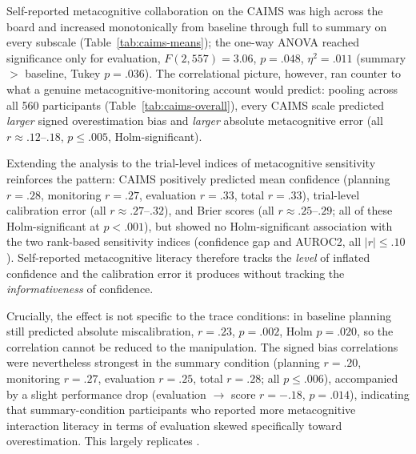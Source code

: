 \documentclass[acmlarge,review=true, anonymous=true]{acmart}
\begin{document}
Self-reported metacognitive collaboration on the CAIMS was high across the board and increased monotonically from baseline through full to summary on every
subscale (Table~\ref{tab:caims-means}); the one-way ANOVA reached
significance only for evaluation, $F(2, 557) = 3.06$, $p = .048$,
$\eta^2 = .011$ (summary $>$ baseline, Tukey $p = .036$). The correlational picture, however, ran counter to what a genuine
metacognitive-monitoring account would predict: pooling across all 560 participants (Table~\ref{tab:caims-overall}), every CAIMS scale
predicted \emph{larger} signed overestimation bias and \emph{larger} absolute metacognitive error (all $r \approx .12$--$.18$,
$p \leq .005$, Holm-significant). 

Extending the analysis to the trial-level indices of metacognitive sensitivity reinforces the pattern: CAIMS
positively predicted mean confidence (planning $r = .28$, monitoring $r = .27$, evaluation $r = .33$, total $r = .33$), trial-level calibration error (all $r \approx .27$--$.32$), and Brier scores (all $r \approx .25$--$.29$; all of these Holm-significant at
$p < .001$), but showed no Holm-significant association with the two rank-based sensitivity indices (confidence gap and AUROC2, all
$|r| \leq .10$). Self-reported metacognitive literacy therefore tracks the \emph{level} of inflated confidence and the calibration error it
produces without tracking the \emph{informativeness} of confidence.

Crucially, the effect is not specific to the trace conditions: in
baseline planning still predicted absolute miscalibration, $r = .23$, $p = .002$,
Holm $p = .020$, so the correlation cannot be reduced to the manipulation. The signed bias correlations were nevertheless
strongest in the summary condition (planning $r = .20$, monitoring $r = .27$, evaluation $r = .25$, total $r = .28$; all $p \leq .006$),
accompanied by a slight performance drop (evaluation $\rightarrow$ score $r = -.18$, $p = .014$), indicating that summary-condition participants who reported more metacognitive interaction literacy in terms of evaluation skewed specifically toward overestimation. This largely replicates \citet{FERNANDES2026108779}. 
\end{document}
